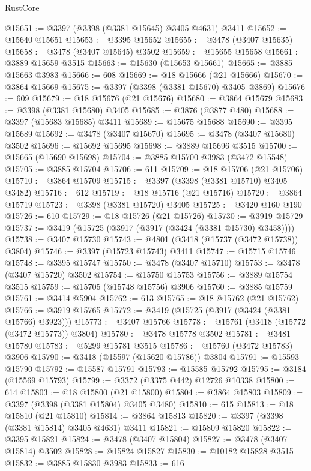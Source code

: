 \begin{lexlean}{RustCore}
\begin{coremodule}
@15651 := @3397 (@3398 (@3381 @15645) @3405 @4631) @3411
@15652 := @15640 @15651
@15653 := @3395 @15652
@15655 := @3478 (@3407 @15635)
@15658 := @3478 (@3407 @15645) @3502
@15659 := @15655 @15658
@15661 := @3889 @15659 @3515
@15663 := @15630 (@15653 @15661)
@15665 := @3885 @15663 @3983
@15666 := 608
@15669 := @18 @15666 (@21 @15666)
@15670 := @3864 @15669
@15675 := @3397 (@3398 (@3381 @15670) @3405 @3869)
@15676 := 609
@15679 := @18 @15676 (@21 @15676)
@15680 := @3864 @15679
@15683 := @3398 (@3381 @15680) @3405
@15685 := @3876 (@3877 @480)
@15688 := @3397 (@15683 @15685) @3411
@15689 := @15675 @15688
@15690 := @3395 @15689
@15692 := @3478 (@3407 @15670)
@15695 := @3478 (@3407 @15680) @3502
@15696 := @15692 @15695
@15698 := @3889 @15696 @3515
@15700 := @15665 (@15690 @15698)
@15704 := @3885 @15700 @3983 (@3472 @15548)
@15705 := @3885 @15704
@15706 := 611
@15709 := @18 @15706 (@21 @15706)
@15710 := @3864 @15709
@15715 := @3397 (@3398 (@3381 @15710) @3405 @3482)
@15716 := 612
@15719 := @18 @15716 (@21 @15716)
@15720 := @3864 @15719
@15723 := @3398 (@3381 @15720) @3405
@15725 := @3420 @160 @190
@15726 := 610
@15729 := @18 @15726 (@21 @15726)
@15730 := @3919 @15729
@15737 := @3419 (@15725 (@3917 (@3917 (@3424 (@3381 @15730) @3458))))
@15738 := @3407 @15730
@15743 := @4801 (@3418 (@15737 (@3472 @15738)) @3804)
@15746 := @3397 (@15723 @15743) @3411
@15747 := @15715 @15746
@15748 := @3395 @15747
@15750 := @3478 (@3407 @15710)
@15753 := @3478 (@3407 @15720) @3502
@15754 := @15750 @15753
@15756 := @3889 @15754 @3515
@15759 := @15705 (@15748 @15756) @3906
@15760 := @3885 @15759
@15761 := @3414 @5904
@15762 := 613
@15765 := @18 @15762 (@21 @15762)
@15766 := @3919 @15765
@15772 := @3419 (@15725 (@3917 (@3424 (@3381 @15766) @3923)))
@15773 := @3407 @15766
@15778 := @15761 (@3418 (@15772 (@3472 @15773)) @3804)
@15780 := @3478 @15778 @3502
@15781 := @3481 @15780
@15783 := @5299 @15781 @3515
@15786 := @15760 (@3472 @15783) @3906
@15790 := @3418 (@15597 (@15620 @15786)) @3804
@15791 := @15593 @15790
@15792 := @15587 @15791
@15793 := @15585 @15792
@15795 := @3184 (@15569 @15793)
@15799 := @3372 (@3375 @442) @12726 @10338
@15800 := 614
@15803 := @18 @15800 (@21 @15800)
@15804 := @3864 @15803
@15809 := @3397 (@3398 (@3381 @15804) @3405 @3480)
@15810 := 615
@15813 := @18 @15810 (@21 @15810)
@15814 := @3864 @15813
@15820 := @3397 (@3398 (@3381 @15814) @3405 @4631) @3411
@15821 := @15809 @15820
@15822 := @3395 @15821
@15824 := @3478 (@3407 @15804)
@15827 := @3478 (@3407 @15814) @3502
@15828 := @15824 @15827
@15830 := @10182 @15828 @3515
@15832 := @3885 @15830 @3983
@15833 := 616

\end{coremodule}
\end{lexlean}
